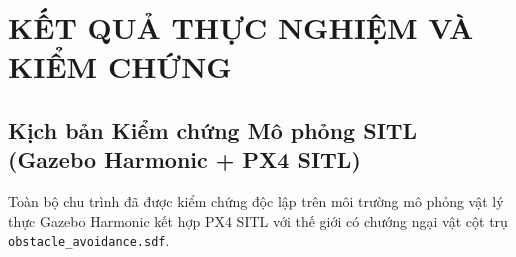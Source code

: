 \documentclass[12pt,a4paper]{article}
\begin{document}
\section{KẾT QUẢ THỰC NGHIỆM VÀ KIỂM CHỨNG}

\subsection{Kịch bản Kiểm chứng Mô phỏng SITL (Gazebo Harmonic + PX4 SITL)}
Toàn bộ chu trình đã được kiểm chứng độc lập trên môi trường mô phỏng vật lý thực Gazebo Harmonic kết hợp PX4 SITL với thế giới có chướng ngại vật cột trụ \texttt{obstacle\_avoidance.sdf}.
\end{document}
